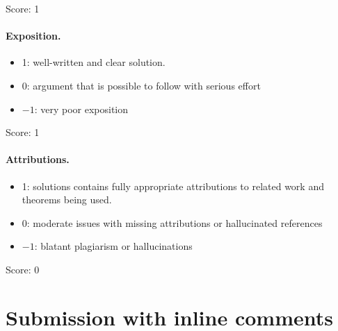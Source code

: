 \documentclass[11pt]{article}
\numberwithin{equation}{section}
\newcommand{\R}{\mathbb R}
\newcommand{\diver}{\operatorname{div}}
\begin{document}
\noindent Score: 1

\paragraph{Exposition.}
\begin{itemize}
	\item  1: well-written and clear solution.
	\item  0: argument that is possible to follow with serious effort
	\item  $-1$: very poor exposition
\end{itemize}

\noindent Score: 1

\paragraph{Attributions.}
\begin{itemize}
	\item  1: solutions contains fully appropriate attributions
		to related work and theorems being used.
	\item  0: moderate issues with missing attributions or hallucinated references
	\item  $-1$: blatant plagiarism or hallucinations
\end{itemize}

\noindent Score: 0

\newpage
\section{Submission with inline comments}


\begin{abstract}
Let $u_f$ solve $\diver(f\nabla u)=1$ in the unit ball $D\subset\R^d$,
$d\ge2$, with zero Dirichlet data, and suppose $u_f$ is observed in
Gaussian white noise of level $n^{-1/2}$. We determine the minimax rate
for recovering the conductivity $f$ in squared $L^2(D)$ loss over a
small H\"older--Zygmund ball $\{\|f-1\|_{C^\alpha(D)}\le r\}$,
$\alpha>1$: it is $n^{-2\alpha/(2\alpha+d+3)}$, with no logarithmic
loss. The upper bound inverts the transport equation
$\nabla u\cdot\nabla f+(\Delta u)f=1$ along the gradient flow of the
smoothed data; a bias cancellation for smoothed products
and a variance gain of one power of the bandwidth from integrating the
differentiated noise along characteristics drive the rate. The lower
bound prescribes exact solutions oscillating in the $d-1$ angular
directions, recovers their conductivities through the same transport
inverse, and applies Fano's inequality.
\end{abstract}
\end{document}
